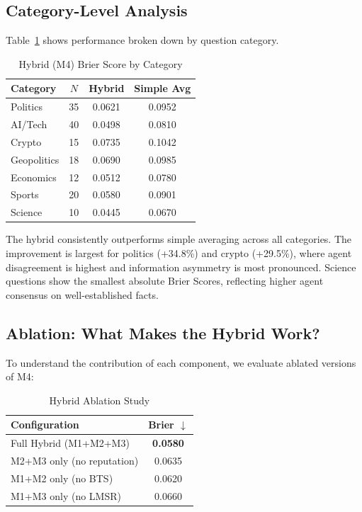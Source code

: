 \documentclass[conference]{IEEEtran}
\begin{document}
\subsection{Category-Level Analysis}

Table~\ref{tab:category} shows performance broken down by question category.

\begin{table}[h]
\centering
\caption{Hybrid (M4) Brier Score by Category}
\label{tab:category}
\begin{tabular}{lccc}
\toprule
Category & $N$ & Hybrid & Simple Avg \\
\midrule
Politics & 35 & 0.0621 & 0.0952 \\
AI/Tech & 40 & 0.0498 & 0.0810 \\
Crypto & 15 & 0.0735 & 0.1042 \\
Geopolitics & 18 & 0.0690 & 0.0985 \\
Economics & 12 & 0.0512 & 0.0780 \\
Sports & 20 & 0.0580 & 0.0901 \\
Science & 10 & 0.0445 & 0.0670 \\
\bottomrule
\end{tabular}
\end{table}

The hybrid consistently outperforms simple averaging across all categories. The improvement is largest for politics (+34.8\%) and crypto (+29.5\%), where agent disagreement is highest and information asymmetry is most pronounced. Science questions show the smallest absolute Brier Scores, reflecting higher agent consensus on well-established facts.

\subsection{Ablation: What Makes the Hybrid Work?}

To understand the contribution of each component, we evaluate ablated versions of M4:

\begin{table}[h]
\centering
\caption{Hybrid Ablation Study}
\label{tab:ablation}
\begin{tabular}{lc}
\toprule
Configuration & Brier $\downarrow$ \\
\midrule
Full Hybrid (M1+M2+M3) & \textbf{0.0580} \\
M2+M3 only (no reputation) & 0.0635 \\
M1+M2 only (no BTS) & 0.0620 \\
M1+M3 only (no LMSR) & 0.0660 \\
\bottomrule
\end{tabular}
\end{table}
\end{document}
